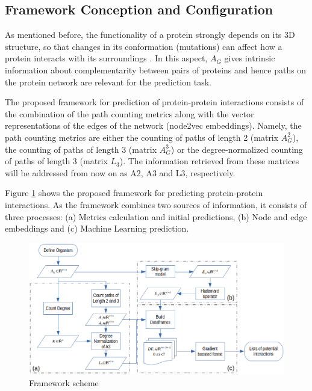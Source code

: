 
\subsection*{Framework Conception and Configuration}

As mentioned before, the functionality of a protein strongly depends on its 3D structure, 
so that changes in its conformation (mutations) can affect how a protein interacts with its 
surroundings \cite{Sikosek2014Prot}. In this aspect, $A_G$ gives intrinsic information 
about complementarity between pairs of proteins and hence paths on the protein network are 
relevant for the prediction task. 

The proposed framework for prediction of protein-protein interactions consists of the
combination of the path counting metrics along with the vector representations of the
edges of the network (node2vec embeddings). Namely, the path counting metrics are either 
the counting of paths of length 2 (matrix $A_G^2$), the counting of paths of length 3 
(matrix $A_G^3$) or the degree-normalized counting of paths of length 3 (matrix $L_3$). 
The information retrieved from these matrices will be addressed from now on as A2, A3 
and L3, respectively.

Figure \ref{fig:framework} shows the proposed framework for predicting protein-protein interactions. As the 
framework combines two sources of information, it consists of three processes: (a) Metrics 
calculation and initial predictions, (b) Node and edge embeddings and (c) Machine Learning 
prediction.

\begin{figure}[h]
\caption{\label{fig:framework}Framework scheme}
	\includegraphics[width=\textwidth ]{figures/framework.eps}
\end{figure}

